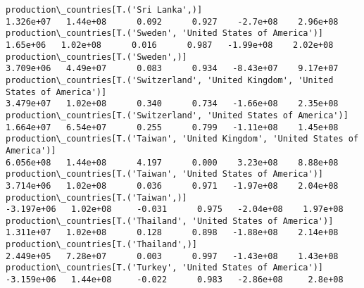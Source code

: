 \documentclass[11pt]{article}
\begin{document}
\begin{Verbatim}[commandchars=\\\{\}]
production\_countries[T.('Sri Lanka',)]                                                                                                                                                 1.326e+07   1.44e+08      0.092      0.927    -2.7e+08    2.96e+08
production\_countries[T.('Sweden', 'United States of America')]                                                                                                                          1.65e+06   1.02e+08      0.016      0.987   -1.99e+08    2.02e+08
production\_countries[T.('Sweden',)]                                                                                                                                                    3.709e+06   4.49e+07      0.083      0.934   -8.43e+07    9.17e+07
production\_countries[T.('Switzerland', 'United Kingdom', 'United States of America')]                                                                                                  3.479e+07   1.02e+08      0.340      0.734   -1.66e+08    2.35e+08
production\_countries[T.('Switzerland', 'United States of America')]                                                                                                                    1.664e+07   6.54e+07      0.255      0.799   -1.11e+08    1.45e+08
production\_countries[T.('Taiwan', 'United Kingdom', 'United States of America')]                                                                                                       6.056e+08   1.44e+08      4.197      0.000    3.23e+08    8.88e+08
production\_countries[T.('Taiwan', 'United States of America')]                                                                                                                         3.714e+06   1.02e+08      0.036      0.971   -1.97e+08    2.04e+08
production\_countries[T.('Taiwan',)]                                                                                                                                                   -3.197e+06   1.02e+08     -0.031      0.975   -2.04e+08    1.97e+08
production\_countries[T.('Thailand', 'United States of America')]                                                                                                                       1.311e+07   1.02e+08      0.128      0.898   -1.88e+08    2.14e+08
production\_countries[T.('Thailand',)]                                                                                                                                                  2.449e+05   7.28e+07      0.003      0.997   -1.43e+08    1.43e+08
production\_countries[T.('Turkey', 'United States of America')]                                                                                                                        -3.159e+06   1.44e+08     -0.022      0.983   -2.86e+08     2.8e+08

\end{Verbatim}
\end{document}
